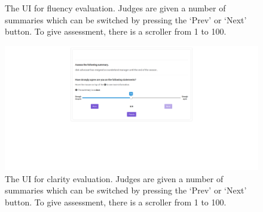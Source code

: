 \documentclass[11pt,a4paper]{article}
\begin{document}
\begin{figure}[ht!]
    \centering
    \caption{The UI for fluency evaluation. Judges are given a number of summaries which can be switched by pressing the `Prev' or `Next' button. To give assessment, there is a scroller from 1 to 100.}
\end{figure}
\begin{figure}[ht!]
    \centering
    \includegraphics[width=17cm]{clarity}
    \caption{The UI for clarity evaluation. Judges are given a number of summaries which can be switched by pressing the `Prev' or `Next' button. To give assessment, there is a scroller from 1 to 100.}
\end{figure}
\end{document}
